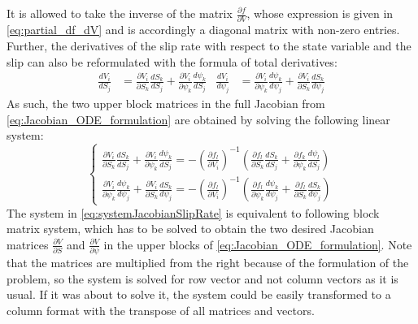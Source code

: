 \documentclass{report}
\begin{document}
It is allowed to take the inverse of the matrix $\frac{\partial f}{\partial V}$, whose expression is given in \autoref{eq:partial_df_dV} and is accordingly a diagonal matrix with non-zero entries. Further, the derivatives of the slip rate with respect to the state variable and the slip can also be reformulated with the formula of total derivatives: 
\begin{align}
\frac{dV_i}{dS_j} &= \frac{\partial V_i}{\partial S_k}\frac{d S_k}{d S_j} + \frac{\partial V_i}{\partial \psi_k}\frac{d\psi_k}{dS_j} &
\frac{dV_i}{d\psi_j} &= \frac{\partial V_i}{\partial \psi_k}\frac{d \psi_k}{d \psi_j} +  \frac{\partial V_i}{\partial S_k}\frac{dS_k}{d\psi_j} 
\end{align}
As such, the two upper block matrices in the full Jacobian from \autoref{eq:Jacobian_ODE_formulation} are obtained by solving the following linear system: 
\begin{equation}
\label{eq:systemJacobianSlipRate}
\begin{cases}
	\frac{\partial V_i}{\partial S_k}\frac{d S_k}{d S_j} + \frac{\partial V_i}{\partial \psi_k}\frac{d\psi_k}{dS_j} = -\left(\frac{\partial f_l}{\partial V_i}\right)^{-1}\left(\frac{\partial f_l}{\partial S_k}\frac{d S_k}{d S_j} + 
	\frac{\partial f_k}{\partial \psi_k}\frac{d \psi_l}{d S_j}\right) \\
	\frac{\partial V_i}{\partial \psi_k}\frac{d \psi_k}{d \psi_j} + \frac{\partial V_i}{\partial S_k}\frac{dS_k}{d\psi_j} = -\left(\frac{\partial f_l}{\partial V_i}\right)^{-1}\left(\frac{\partial f_l}{\partial \psi_k}\frac{d \psi_k}{d \psi_j} + 
	\frac{\partial f_l}{\partial S_k}\frac{d S_k}{d \psi_j}\right) 
\end{cases}
\end{equation}
The system in \autoref{eq:systemJacobianSlipRate} is equivalent to following block matrix system, which has to be solved to obtain the two desired Jacobian matrices $\frac{\partial V}{\partial S}$ and $\frac{\partial V}{\partial \psi}$ in the upper blocks of \autoref{eq:Jacobian_ODE_formulation}. Note that the matrices are multiplied from the right because of the formulation of the problem, so the system is solved for row vector and not column vectors as it is usual. If it was about to solve it, the system could be easily transformed to a column format with the transpose of all matrices and vectors.
\end{document}
